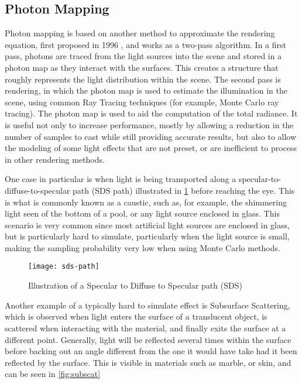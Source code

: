 \documentclass[main.tex]{subfiles}
\begin{document}
\subsection{Photon Mapping}

Photon mapping is based on another method to approximate the rendering equation, first proposed in 1996 \cite{jensen1996global}, and works as a two-pass algorithm. In a first pass, photons are traced from the light sources into the scene and stored in a photon map as they interact with the surfaces. This creates a structure that roughly represents the light distribution within the scene. The second pass is rendering, in which the photon map is used to estimate the illumination in the scene, using common Ray Tracing techniques (for example, Monte Carlo ray tracing). The photon map is used to aid the computation of the total radiance. It is useful not only to increase performance, mostly by allowing a reduction in the number of samples to cast while still providing accurate results, but also to allow the modeling of some light effects that are not preset, or are inefficient to process in other rendering methods.

One case in particular is when light is being transported along a specular-to-diffuse-to-specular path (SDS path) illustrated in \cref{fig:sdspath} before reaching the eye. This is what is commonly known as a caustic, such as, for example, the shimmering light seen of the bottom of a pool, or any light source enclosed in glass. This scenario is very common since most artificial light sources are enclosed in glass, but is particularly hard to simulate, particularly when the light source is small, making the sampling probability very low when using Monte Carlo methods.

\begin{figure}[!htp]
  \centering
  \texttt{[image: sds-path]}
  \caption{Illustration of a Specular to Diffuse to Specular path (SDS) \label{fig:sdspath}}
\end{figure}

Another example of a typically hard to simulate effect is Subsurface Scattering, which is observed when light enters the surface of a translucent object, is scattered when interacting with the material, and finally exits the surface at a different point. Generally, light will be reflected several times within the surface before backing out an angle different from the one it would have take had it been reflected by the surface. This is visible in materials such as marble, or skin, and can be seen in \cref{fig:subscat}
\end{document}

